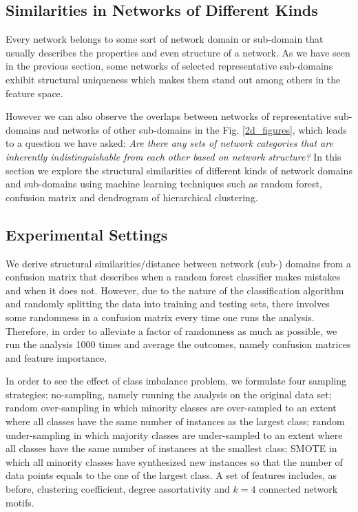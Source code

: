 \documentclass{article}
\begin{document}
\subsection{Similarities in Networks of Different Kinds}
Every network belongs to some sort of network domain or sub-domain that usually describes the properties and even structure of a network. As we have seen in the previous section, some networks of selected representative sub-domains exhibit structural uniqueness which makes them stand out among others in the feature space.

However we can also observe the overlaps between networks of representative sub-domains and networks of other sub-domains in the Fig. \ref{2d_figures}, which leads to a question we have asked:  \textit{Are there any sets of network categories that are inherently indistinguishable from each other based on network structure?} In this section we explore the structural similarities of different kinds of network domains and sub-domains using machine learning techniques such as random forest, confusion matrix and dendrogram of hierarchical clustering.  

\subsection{Experimental Settings}
We derive structural similarities/distance between network (sub-) domains from a confusion matrix that describes when a random forest classifier makes mistakes and when it does not. However, due to the nature of the classification algorithm and randomly splitting the data into training and testing sets, there involves some randomness in a confusion matrix every time one runs the analysis. Therefore, in order to alleviate a factor of randomness as much as possible, we run the analysis 1000 times and average the outcomes, namely confusion matrices and feature importance. 

In order to see the effect of class imbalance problem, we formulate four sampling strategies: no-sampling, namely running the analysis on the original data set; random over-sampling in which minority classes are over-sampled to an extent where all classes have the same number of instances as the largest class; random under-sampling in which majority classes are under-sampled to an extent where all classes have the same number of instances at the smallest class; SMOTE in which all minority classes have synthesized new instances so that the number of data points equals to the one of the largest class. A set of features includes, as before, clustering coefficient, degree assortativity and $k = 4$ connected network motifs.
 
\end{document}
